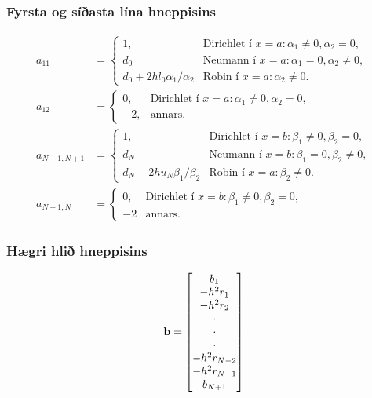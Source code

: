 \documentclass[icelandic,a4paper,12pt]{article}
\begin{document}
\subsubsection{Fyrsta og síðasta lína hneppisins} 
  \begin{align*}
a_{11}&=
\begin{cases}
  1,&\text{Dirichlet í } x=a: \alpha_1\neq 0, \alpha_2=0,\\
d_0&\text{Neumann í } x=a:  \alpha_1=0, \alpha_2\neq 0,\\
d_0+2hl_0\alpha_1/\alpha_2&\text{Robin í } x=a:  \alpha_2\neq 0.
\end{cases} \\
a_{12}&=
\begin{cases}
  0,&\text{Dirichlet í } x=a: \alpha_1\neq 0, \alpha_2=0,\\
-2,&\text{annars}.
\end{cases}
\\ 
a_{N+1,N+1}&=
\begin{cases}
  1,&\text{Dirichlet í } x=b: \beta_1\neq 0, \beta_2=0,\\
d_N&\text{Neumann í } x=b:  \beta_1=0, \beta_2\neq 0,\\
d_N-2hu_N\beta_1/\beta_2&\text{Robin í } x=a:  \beta_2\neq 0.
\end{cases} 
\\
a_{N+1,N}&=
\begin{cases}
  0,&\text{Dirichlet í } x=b: \beta_1\neq 0, \beta_2=0,\\
-2&\text{annars}.
\end{cases} 
  \end{align*}



\subsubsection{Hægri hlið hneppisins} 
$$
\mbox{${\bf b}$}=\left[
\begin{matrix}
b_1 \\ -h^2r_1\\ -h^2r_2\\ \cdot \\ \cdot\\ \cdot\\
-h^2r_{N-2}\\ -h^2r_{N-1}\\ b_{N+1}
\end{matrix}\right]
$$
\end{document}
